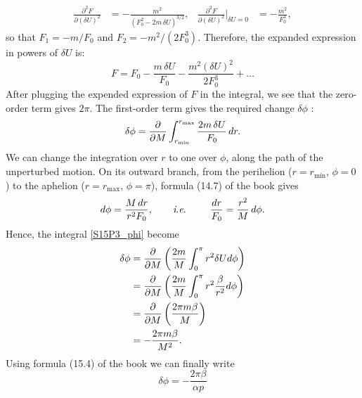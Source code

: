 \begin{subproblem}
{\begin{align*}
    \frac{\partial^2 F}{\partial (\delta U)^2} &= -\frac{m^2}{\left(F_0^2 - 2m\,\delta U\right)^{3/2}}, &
    \frac{\partial^2 F}{\partial (\delta U)^2}\Big|_{\delta U=0} &= -\frac{m^2}{F_0^3},
\end{align*}
so that $F_1 = -m/F_0$ and $F_2 = -m^2/(2F_0^3)$. Therefore, the expanded expression in powers of $\delta U$ is:
\begin{equation*}
    F = F_0 - \frac{m\,\delta U}{F_0} - \frac{m^2(\delta U)^2}{2F_0^3} + \ldots
\end{equation*}
After plugging the expended expression of $F$ in the integral, we see that the zero-order term gives $2\pi$. The first-order term gives the required change $\delta \phi$ :
\begin{equation} \label{S15P3_phi}
    \delta \phi = \frac{\partial }{\partial M}\int_{r_{\text{min}}}^{r_{\text{max}}} \frac{2m\,\delta U}{F_0}\,dr.
\end{equation}
We can change the integration over $r$ to one over $\phi$, along the path of the unperturbed motion. On its outward branch, from the perihelion ($r = r_{\text{min}}$, $\phi = 0$) to the aphelion ($r = r_{\text{max}}$, $\phi = \pi$), formula (14.7) of the book gives
\begin{equation*}
    d\phi = \frac{M\,dr}{r^2F_0},
    \qquad \text{\textit{i}.\textit{e}. } \qquad
    \frac{dr}{F_0} = \frac{r^2}{M}\,d\phi .
\end{equation*}
Hence, the integral \eqref{S15P3_phi} become
\begin{align}
    \delta \phi &= \frac{\partial }{\partial M}\left( \frac{2m}{M} \int_0^\pi r^2\delta Ud\phi \right) \label{S15P3_dphi} \\
    &= \frac{\partial }{\partial M}\left( \frac{2m}{M} \int_0^\pi r^2\frac{\beta}{r^2}d\phi \right) \nonumber \\
    &= \frac{\partial }{\partial M}\left( \frac{2\pi m\beta}{M} \right) \nonumber  \\
    &= -\frac{2\pi m\beta}{M^2}. \nonumber
\end{align}
Using formula (15.4) of the book we can finally write
}
{
\begin{equation*}
    \delta \phi = -\frac{2\pi\beta}{\alpha p}
\end{equation*}
}
\end{subproblem}
